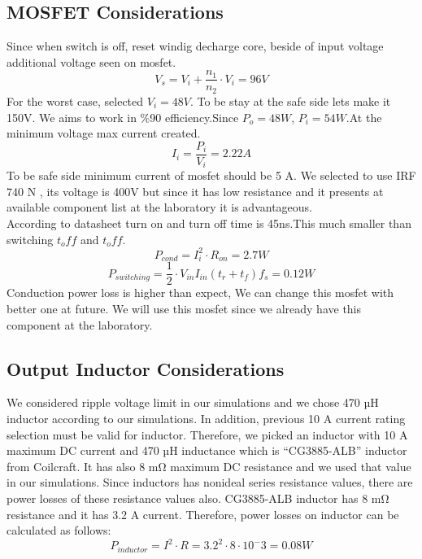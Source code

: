 \documentclass{article}
\begin{document}
\subsection{MOSFET Considerations}
Since when switch is off, reset windig decharge core, beside of input voltage additional voltage seen on mosfet.
\begin{equation}
    V_s=V_i+\frac{n_1}{n_2}\cdot V_i=96 V
\end{equation}
For the worst case, selected $V_i=48V$. To be stay at the safe side lets make it 150V.
We aims to work in \%90 efficiency.Since $P_o=48 W$, $P_i=54 W$.At the minimum voltage max current created.
\begin{equation}
    I_i=\frac{P_i}{V_i}=2.22 A
\end{equation}
To be safe side minimum current of mosfet should be 5 A.
We selected to use IRF 740 N \cite{mosfet}, its voltage is 400V but since it has low resistance and it presents at available component list at the laboratory it is advantageous.
\\According to datasheet turn on and turn off time is 45ns.This much smaller than switching $t_off$ and $t_off$.
\begin{equation}
    P_{cond}=I_{i}^2\cdot R_{on}=2.7 W
\end{equation}
\begin{equation}
    P_{switching}=\frac{1}{2}\cdot V_{in}I_{in}(t_r+t_f)f_s=0.12W
\end{equation}
Conduction power loss is higher than expect, We can change this mosfet with better one at future. We will use this mosfet since we already have this component at the laboratory.
\subsection{Output Inductor Considerations}
We considered ripple voltage limit in our simulations and we chose 470 µH inductor according to our simulations. In addition, previous 10 A current rating selection must be valid for inductor. Therefore, we picked an inductor with 10 A maximum DC current and 470 µH inductance which is “CG3885-ALB” inductor from Coilcraft. It has also 8 mΩ maximum DC resistance and we used that value in our simulations.
Since inductors has nonideal series resistance values, there are power losses of these resistance values also. CG3885-ALB inductor has 8 mΩ resistance and it has 3.2 A current. Therefore, power losses on inductor can be calculated as follows:
\begin{equation}
    P_{inductor}=I^2\cdot R=3.2^2\cdot 8\cdot 10^-3=0.08W
\end{equation}
\end{document}
